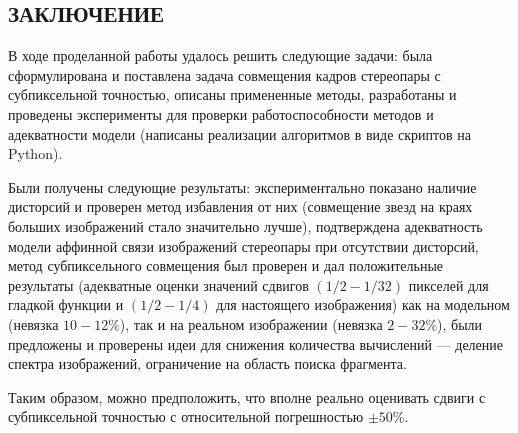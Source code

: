 \begin{center}\section*{ЗАКЛЮЧЕНИЕ} \end{center}
В ходе проделанной работы удалось решить следующие задачи: была сформулирована и поставлена задача совмещения кадров стереопары с субпиксельной точностью, описаны примененные методы, разработаны и проведены эксперименты для проверки работоспособности методов и адекватности модели (написаны реализации алгоритмов в виде скриптов на Python).

Были получены следующие результаты: экспериментально показано наличие дисторсий и проверен метод избавления от них (совмещение звезд на краях больших изображений стало значительно лучше), подтверждена адекватность модели аффинной связи изображений стереопары при отсутствии дисторсий, метод субпиксельного совмещения был проверен и дал положительные результаты (адекватные оценки значений сдвигов $(1/2 - 1/32)$ пикселей для гладкой функции и $(1/2 - 1/4)$ для настоящего изображения) как на модельном (невязка $10-12\%$), так и на реальном изображении (невязка $2-32\%$), были предложены и проверены идеи для снижения количества вычислений --- деление спектра изображений, ограничение на область поиска фрагмента.

Таким образом, можно предположить, что вполне реально оценивать сдвиги с субпиксельной точностью с относительной погрешностью $\pm 50 \%$.
